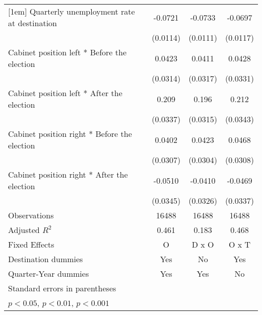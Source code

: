 \begin{table}[htbp]
\begin{tabular}{l*{3}{c}}
[1em]
Quarterly unemployment rate at destination&     -0.0721\sym{***}&     -0.0733\sym{***}&     -0.0697\sym{***}\\
                    &    (0.0114)         &    (0.0111)         &    (0.0117)         \\
[1em]
Cabinet position left * Before the election&      0.0423         &      0.0411         &      0.0428         \\
                    &    (0.0314)         &    (0.0317)         &    (0.0331)         \\
[1em]
Cabinet position left * After the election&       0.209\sym{***}&       0.196\sym{***}&       0.212\sym{***}\\
                    &    (0.0337)         &    (0.0315)         &    (0.0343)         \\
[1em]
Cabinet position right * Before the election&      0.0402         &      0.0423         &      0.0468         \\
                    &    (0.0307)         &    (0.0304)         &    (0.0308)         \\
[1em]
Cabinet position right * After the election&     -0.0510         &     -0.0410         &     -0.0469         \\
                    &    (0.0345)         &    (0.0326)         &    (0.0337)         \\
\hline
Observations        &       16488         &       16488         &       16488         \\
Adjusted \(R^{2}\)  &       0.461         &       0.183         &       0.468         \\
Fixed Effects       &           O         &       D x O         &       O x T         \\
Destination dummies &         Yes         &          No         &         Yes         \\
Quarter-Year dummies&         Yes         &         Yes         &          No         \\
\hline\hline
\multicolumn{4}{l}{\footnotesize Standard errors in parentheses}\\
\multicolumn{4}{l}{\footnotesize \sym{*} \(p<0.05\), \sym{**} \(p<0.01\), \sym{***} \(p<0.001\)}\\
\end{tabular}
\end{table}
